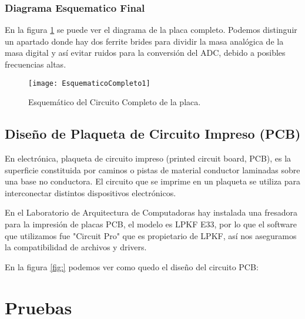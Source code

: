 
\subsubsection{Diagrama Esquematico Final}
\label{esquematico_final_1}

En la figura \ref{fig:EsquematicoCompleto1} se puede ver el diagrama de la placa completo. 
Podemos distinguir un apartado donde hay dos ferrite brides para dividir la masa analógica de la masa digital y así evitar ruidos para la conversión del ADC, debido a posibles frecuencias altas.

\begin{figure}
\centering
  \texttt{[image: EsquematicoCompleto1]}
  \caption{Esquemático del Circuito Completo de la placa.}\label{fig:EsquematicoCompleto1}
\end{figure}



\subsection{Diseño de Plaqueta de Circuito Impreso (PCB)}
\label{pcb1}

En electrónica, plaqueta de circuito impreso (printed circuit board, PCB), es la superficie constituida por caminos o pistas de material conductor laminadas sobre una base no conductora. El circuito que se imprime en un plaqueta se utiliza para interconectar distintos dispositivos electrónicos.

En el Laboratorio de Arquitectura de Computadoras hay instalada una fresadora para la impresión de placas PCB, el modelo es LPKF E33, por lo que el software que utilizamos fue "Circuit Pro" que es propietario de LPKF, así nos aseguramos la compatibilidad de archivos y drivers.

En la figura \ref{fig:} podemos ver como quedo el diseño del circuito PCB:

\begin{figure}

\end{figure}




\section{Pruebas} %
\label{sec:pruebas}

